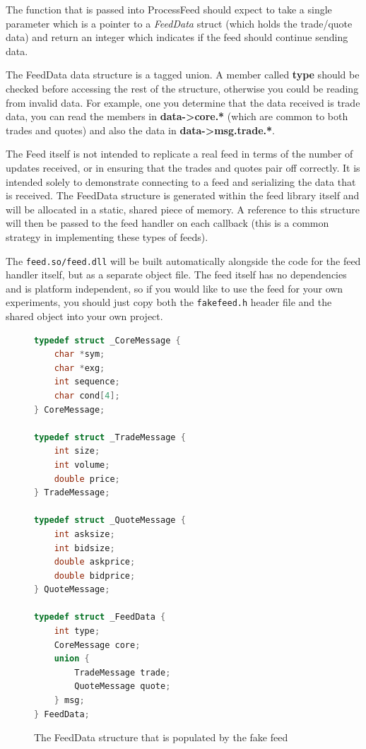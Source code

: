 The function that is passed into ProcessFeed should expect to take a single parameter
which is a pointer to a \textit{FeedData} struct (which holds the trade/quote data)
and return an integer which indicates if the feed should continue sending data.

The FeedData data structure is a tagged union. A member called \textbf{type} should
be checked before accessing the rest of the structure, otherwise you could be reading
from invalid data. For example, one you determine that the data received is trade data,
you can read the members in \textbf{data->core.*} (which are common to both trades and
quotes) and also the data in \textbf{data->msg.trade.*}.

The Feed itself is not intended to replicate a real feed in terms of the number of updates
received, or in ensuring that the trades and quotes pair off correctly. It is intended solely
to demonstrate connecting to a feed and serializing the data that is received.  The FeedData
structure is generated within the feed library itself and will be allocated in a static, shared
piece of memory. A reference to this structure will then be passed to the feed handler on each
callback (this is a common strategy in implementing these types of feeds).

The \verb|feed.so/feed.dll| will be built automatically alongside the code for the feed handler
itself, but as a separate object file. The feed itself has no dependencies and is platform
independent, so if you would like to use the feed for your own experiments, you should just copy
both the \verb|fakefeed.h| header file and the shared object into your own project.

\begin{figure}[h]
\begin{lstlisting}[language=C]
typedef struct _CoreMessage {
	char *sym;
	char *exg;
	int sequence;
	char cond[4];
} CoreMessage;

typedef struct _TradeMessage {
	int size;
	int volume;
	double price;
} TradeMessage;

typedef struct _QuoteMessage {
	int asksize;
	int bidsize;
	double askprice;
	double bidprice;
} QuoteMessage;

typedef struct _FeedData {
	int type;
	CoreMessage core;
	union {
		TradeMessage trade;
		QuoteMessage quote;
	} msg;
} FeedData;

\end{lstlisting}
\caption{The FeedData structure that is populated by the fake feed}
\end{figure}


